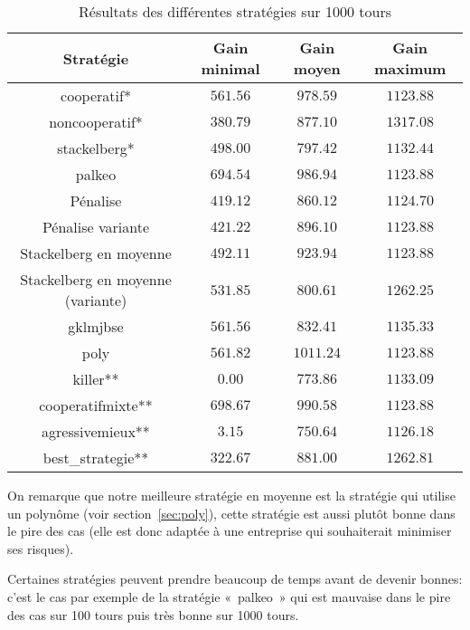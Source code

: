 \documentclass{scrartcl}
\begin{document}
    \begin{table}[f]
      \centering
      \begin{tabular}{|c||c|c|c|}
        \hline
        Stratégie      & Gain minimal & Gain moyen & Gain maximum \\\hline\hline
         cooperatif* & $561.56$ & $978.59$ & $1123.88$ \\\hline
      noncooperatif* & $380.79$ & $877.10$ & $1317.08$ \\\hline
        stackelberg* & $498.00$ & $797.42$ & $1132.44$ \\\hline
              palkeo & $694.54$ & $986.94$ & $1123.88$ \\\hline
            Pénalise & $419.12$ & $860.12$ & $1124.70$ \\\hline
   Pénalise variante & $421.22$ & $896.10$ & $1123.88$ \\\hline
Stackelberg en moyenne & $492.11$ & $923.94$ & $1123.88$ \\\hline
Stackelberg en moyenne (variante) & $531.85$ & $800.61$ & $1262.25$ \\\hline
            gklmjbse & $561.56$ & $832.41$ & $1135.33$ \\\hline
                poly & $561.82$ & $1011.24$ & $1123.88$ \\\hline
            killer** & $  0.00$ & $773.86$ & $1133.09$ \\\hline
   cooperatifmixte** & $698.67$ & $990.58$ & $1123.88$ \\\hline
    agressivemieux** & $  3.15$ & $750.64$ & $1126.18$ \\\hline
   best\_strategie** & $322.67$ & $881.00$ & $1262.81$ \\\hline
      \end{tabular}
      \caption{Résultats des différentes stratégies sur 1000 tours}
      \label{table:coop_results2}
    \end{table}

    On remarque que notre meilleure stratégie en moyenne est la stratégie qui
    utilise un polynôme (voir section~\ref{sec:poly}), cette stratégie est
    aussi plutôt bonne dans le pire des cas (elle est donc adaptée à une
    entreprise qui souhaiterait minimiser ses risques).

    Certaines stratégies peuvent prendre beaucoup de temps avant de devenir
    bonnes: c'est le cas par exemple de la stratégie «~palkeo~» qui est
    mauvaise dans le pire des cas sur 100 tours puis très bonne sur 1000 tours.
\end{document}
